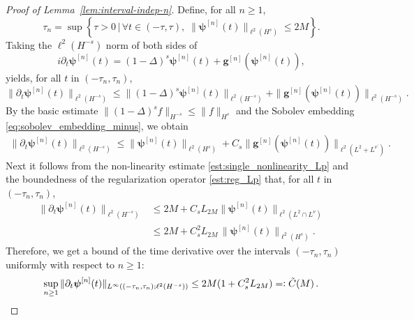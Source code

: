 \documentclass[12pt,a4paper]{amsart}
\numberwithin{equation}{section}
\newcommand{\ulg}{\boldsymbol{g}}
\newcommand{\ulpsi}{\boldsymbol{\psi}}
\newcommand{\Clip}[1]{L_{#1}}
\begin{document}
	\begin{proof}[Proof of Lemma~\ref{lem:interval-indep-n}]
		Define, for all $ n \geq 1$, 
		\begin{equation}\label{def:taun}
			\tau_n = \sup \left\{ \tau >0 \,\Big|\, \forall t \in (-\tau, \tau), \; \| \ulpsi^{[n]}(t) \|_{\ell^2(H^{s})} \leq 2M  \right\} .
		\end{equation}
		Taking the $\ell^2(H^{-s})$ norm of both sides of
		\begin{equation*}
			i \partial_t \ulpsi^{[n]}(t) = (1-\Delta)^s \ulpsi^{[n]}(t) +  \ulg^{[n]}(\ulpsi^{[n]}(t)) ,
		\end{equation*}
		yields, for all $t$ in  $(-\tau_n, \tau_n) $,
		\begin{equation*}
			\| \partial_t \ulpsi^{[n]}(t) \|_{\ell^2(H^{-s})} 
			\leq  \| (1-\Delta)^s \ulpsi^{[n]}(t) \|_{\ell^2(H^{-s})}
			+  \|  \ulg^{[n]}(\ulpsi^{[n]}(t)) \|_{\ell^2(H^{-s})} .
		\end{equation*}
		By the basic estimate $ \| (1-\Delta)^s f \|_{H^{-s}} \leq \| f \|_{H^{s}} $ and the Sobolev embedding \eqref{eq:sobolev_embedding_minus}, we obtain
		\begin{align*}
			\| \partial_t \ulpsi^{[n]}(t) \|_{\ell^2(H^{-s})} \leq \|  \ulpsi^{[n]}(t) \|_{\ell^2(H^{s})}
			+  C_{s} \| \ulg^{[n]}(\ulpsi^{[n]}(t)) \|_{\ell^2(L^2+L^{\nu^\prime})} .
		\end{align*}
		Next it follows from the non-linearity estimate \eqref{est:single_nonlinearity_Lp} and the boundedness of the regularization operator \eqref{est:reg_Lp} that, for all $t$ in $(-\tau_n, \tau_n) $,
		\begin{align*}
			\| \partial_t \ulpsi^{[n]}(t) \|_{\ell^2(H^{-s})} 
			& \leq  2M 
			+  C_{s} \Clip{2M}  \| \ulpsi^{[n]}(t) \|_{\ell^2(L^2\cap L^\nu)}  \\
			& \leq  2M + C_{s}^2 \Clip{2M} \, \| \ulpsi^{[n]}(t) \|_{\ell^2(H^s)}  .
		\end{align*}
		Therefore, we get a bound of the time derivative over the intervals $ (-\tau_n,\tau_n)$ uniformly with respect to $ n \geq 1$:
		\begin{equation}\label{eq:b0}
			\sup_{n \geq 1} \| \partial_t \ulpsi^{[n]}(t) \|_{L^{\infty}((-\tau_n,\tau_n);\ell^2(H^{-s}))} \leq 2M(1 +  C_s^2  \Clip{2M}  ) = \vcentcolon \tilde{C}(M) \,.
		\end{equation}

\end{proof}
\end{document}
